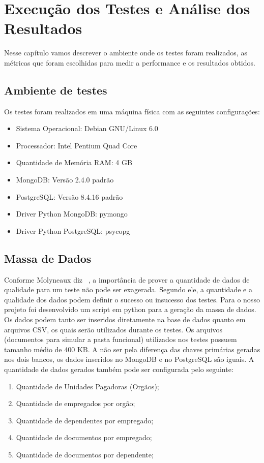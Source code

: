 \chapter {Execução dos Testes e Análise dos Resultados}

Nesse capítulo vamos descrever o ambiente onde os testes foram realizados, as métricas que foram escolhidas para medir a performance e os resultados obtidos.

\section{Ambiente de testes}

Os testes foram realizados em uma máquina física com as seguintes configurações:

\begin{itemize}
\item Sistema Operacional: Debian GNU/Linux 6.0
\item Processador: Intel Pentium Quad Core
\item Quantidade de Memória RAM: 4 GB
\item MongoDB: Versão 2.4.0 padrão
\item PostgreSQL: Versão 8.4.16 padrão
\item Driver Python MongoDB: pymongo
\item Driver Python PostgreSQL: psycopg
\end{itemize}

\section{Massa de Dados}

Conforme Molyneaux diz ~\cite{theartoftestperf}, a importância de prover a quantidade de dados de qualidade para um teste não pode ser exagerada. Segundo ele, a quantidade e a qualidade dos dados podem definir o sucesso ou insucesso dos testes. Para o nosso projeto foi desenvolvido um script em python para a geração da massa de dados. Os dados podem tanto ser inseridos diretamente na base de dados quanto em arquivos CSV, os quais serão utilizados durante os testes. Os arquivos (documentos para simular a pasta funcional) utilizados nos testes possuem tamanho médio de 400 KB. A não ser pela diferença das chaves primárias geradas nos dois bancos, os dados inseridos no MongoDB e no PostgreSQL são iguais. A quantidade de dados gerados também pode ser configurada pelo seguinte:

\begin{enumerate}
	\item Quantidade de Unidades Pagadoras (Orgãos);
	\item Quantidade de empregados por orgão;
	\item Quantidade de dependentes por empregado;
	\item Quantidade de documentos por empregado;
	\item Quantidade de documentos por dependente;
\end{enumerate}

